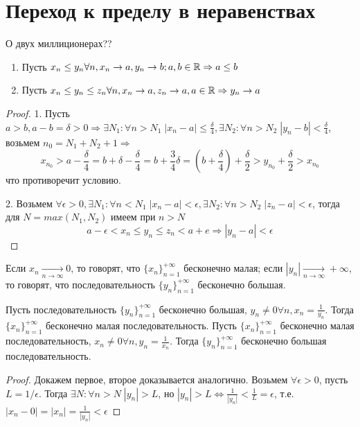 \documentclass[main]{subfiles}
\begin{document}
\section{Переход к пределу в неравенствах}
\begin{theorem} О двух миллиционерах??
    \begin{enumerate}
        \item Пусть $x_n \leq y_n \forall n, x_n \to a, y_n \to b; a, b \in \mathbb{R}
    \Rightarrow a \leq b$
        \item Пусть $x_n \leq y_n \leq z_n \forall n, x_n \to a, z_n \to a,
    a \in \mathbb{R} \Rightarrow y_n \to a$
    \end{enumerate} 
\end{theorem}
\begin{proof}
    1. Пусть $a > b, a - b = \delta > 0 \Rightarrow \exists N_1 : \forall n > N_1
    \; |x_n - a| \leq \frac{\delta}{4}, \exists N_2 : \forall n > N_2 \; 
    |y_n - b| < \frac{\delta}{4}$, возьмем $n_0 = N_1 + N_2 + 1 \Rightarrow$
    \begin{equation*}
        x_{n_0} > a - \frac{\delta}{4} = b + \delta - \frac{\delta}{4} = 
        b + \frac{3}{4}\delta = (b + \frac{\delta}{4}) + \frac{\delta}{2} >
        y_{n_0} + \frac{\delta}{2} > x_{n_0}
    \end{equation*}
    что противоречит условию.

    2. Возьмем $\forall \epsilon > 0, \exists N_1 : \forall n < N_1 \; 
    |x_n - a| < \epsilon, \exists N_2 : \forall n > N_2 \; |z_n - a| < \epsilon$,
    тогда для $N = max(N_1, N_2)$ имеем при $n > N$
    \begin{equation*}
        a - \epsilon < x_n \leq y_n \leq z_n < a + e \Rightarrow 
        |y_n - a| < \epsilon 
    \end{equation*}
\end{proof}

\begin{term}
    Если $x_n \underset{n\to\infty}{\to} 0$, то говорят, что 
    $\{x_n\}_{n=1}^{+\infty}$ бесконечно малая; если $|y_n| \underset{n\to\infty}{\to}
    +\infty$, то говорят, что последовательность $\{y_n\}_{n=1}^{+\infty}$ 
    бесконечно большая.
\end{term}

\begin{assertion}
    Пусть последовательность $\{y_n\}_{n=1}^{+\infty}$ бесконечно большая, 
    $y_n \neq 0 \forall n, x_n = \frac{1}{y_n}$. Тогда 
    $\{x_n\}_{n=1}^{+\infty}$ бесконечно малая последовательность.
    Пусть $\{x_n\}_{n=1}^{+\infty}$ бесконечно малая последовательность, 
    $x_n \neq 0 \forall n, y_n = \frac{1}{x_n}$. Тогда $\{y_n\}_{n=1}^{+\infty}$
    бесконечно большая последовательность.
\end{assertion}
\begin{proof}
    Докажем первое, второе доказывается аналогично. Возьмем $\forall \epsilon > 0$,
    пусть $L = 1 / \epsilon$. Тогда $\exists N : \forall n > N \; |y_n| > L$, но
    $|y_n| > L \Leftrightarrow \frac{1}{|y_n|} < \frac{1}{L} = \epsilon$, т.е.
    $|x_n - 0| = |x_n| = \frac{1}{|y_n|} < \epsilon$
\end{proof}
\end{document}
